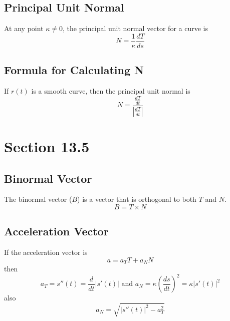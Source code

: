 \documentclass[12pt]{article}
\theoremstyle{break}
\numberwithin{theorem}{subsection}
\numberwithin{lemma}{subsection}
\numberwithin{corollary}{subsection}
\numberwithin{equation}{subsection}
\begin{document}
\subsection{Principal Unit Normal}
At any point $\kappa \neq 0$, the principal unit normal vector for a curve is 
\begin{equation*}
N = \frac{1}{\kappa} \frac{dT}{ds}
\end{equation*}

\subsection{Formula for Calculating N}
If $r(t)$ is a smooth curve, then the principal unit normal is
\begin{equation*}
N = \frac{\frac{dT}{dt}}{\left| \frac{dT}{dt} \right |}
\end{equation*}

\section{Section 13.5}

\subsection{Binormal Vector}
The binormal vector ($B$) is a vector that is orthogonal to both $T$ and $N$. 
\begin{equation*}
B = T \times N 
\end{equation*}

\subsection{Acceleration Vector}
If the acceleration vector is 
\begin{equation*}
a = a_T T + a_N N
\end{equation*}
then 
\begin{equation*}
a_T = s''(t) = \frac{d}{dt} |s'(t)| \text{ and } a_N = \kappa \left( \frac{ds}{dt} \right)^2 = \kappa |s'(t)|^2
\end{equation*}
also
\begin{equation*}
a_N = \sqrt{|s''(t)|^2 - a_T^2}
\end{equation*}
\end{document}
